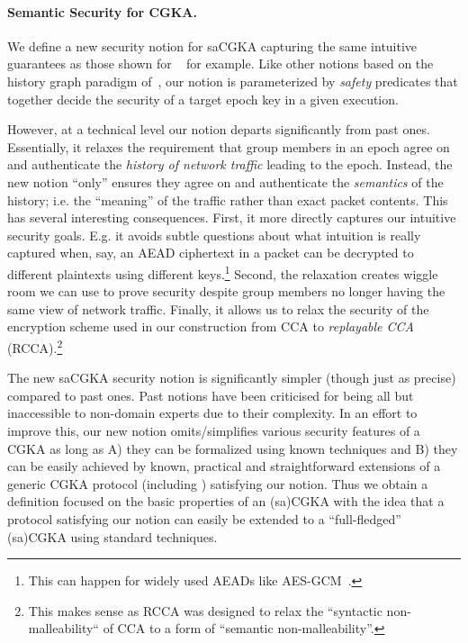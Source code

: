 \paragraph{Semantic Security for CGKA.}
We define a new security notion for saCGKA capturing the same intuitive
guarantees as those shown for \protITK~\cite{EPRINT:AlwJosMul20} for example.
Like other notions based on the history graph paradigm of~\cite{CCS:ACDT21},
our notion is parameterized by \emph{safety} predicates that together decide
the security of a target epoch key in a given execution.

However, at a technical level our notion departs significantly from past
ones. Essentially, it relaxes the requirement that group members in an epoch
agree on and authenticate the \emph{history of network traffic} leading to
the epoch. Instead, the new notion ``only'' ensures they agree on and
authenticate the \emph{semantics} of the history; i.e. the ``meaning'' of the
traffic rather than exact packet contents. This has several interesting
consequences. First, it more directly captures our intuitive security goals.
E.g. it avoids subtle questions about what intuition is really captured when,
say, an AEAD ciphertext in a packet can be decrypted to different plaintexts
using different keys.\footnote{This can happen for widely used AEADs like
AES-GCM~\cite{C:DGRW18}.} Second, the relaxation creates wiggle
room we can use to prove security despite group members no longer having the
same view of network traffic. Finally, it allows us to relax the security of
the encryption scheme used in our construction from CCA to
\emph{replayable CCA} (RCCA)\cite{C:CanKraNie03}.\footnote{This makes sense
as RCCA was designed to relax the ``syntactic non-malleability`` of CCA to a
form of ``semantic non-malleability''.}

The new saCGKA security notion is significantly simpler (though just as
precise) compared to past ones. Past notions have been criticised for being
all but inaccessible to non-domain experts due to their complexity. In an
effort to improve this, our new notion omits/simplifies various security
features of a CGKA as long as A) they can be formalized using known
techniques and B) they can be easily achieved by known, practical and
straightforward extensions of a generic CGKA protocol (including \saik)
satisfying our notion. Thus we obtain a definition focused on the basic
properties of an (sa)CGKA with the idea that a protocol satisfying our notion
can easily be extended to a ``full-fledged'' (sa)CGKA using standard
techniques.

